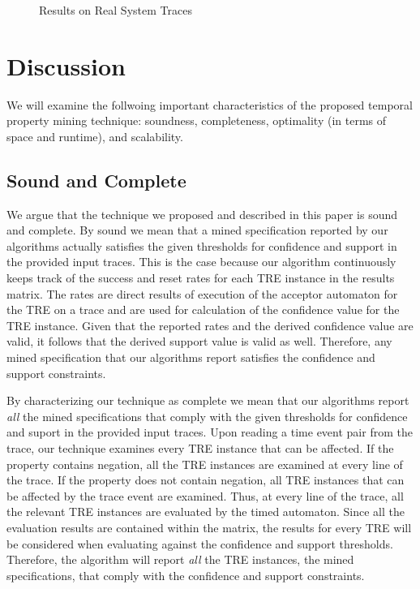 \documentclass[]{sigplanconf}
\begin{document}
\begin{figure}[!ht]
  \centering
  \caption{Results on Real System Traces}\label{Algs_real}
\end{figure}

\section{Discussion} \label{discussion}

We will examine the follwoing important characteristics of the proposed temporal property mining technique: soundness, completeness, optimality (in terms of space and runtime), and scalability.


\subsection{Sound and Complete}

We argue that the technique we proposed and described in this paper is sound and complete. By sound we mean that a mined specification reported by our algorithms actually satisfies the given thresholds for confidence and support in the provided input traces. This is the case because our algorithm continuously keeps track of the success and reset rates for each TRE instance in the results matrix. The rates are direct results of execution of the acceptor automaton for the TRE on a trace and are used for calculation of the confidence value for the TRE instance. Given that the reported rates and the derived confidence value are valid, it follows that the derived support value is valid as well. Therefore, any mined specification that our algorithms report satisfies the confidence and support constraints.

By characterizing our technique as complete we mean that our algorithms report \emph{all} the mined specifications that comply with the given thresholds for confidence and suport in the provided input traces. Upon reading a time event pair from the trace, our technique examines every TRE instance that can be affected. If the property contains negation, all the TRE instances are examined at every line of the trace. If the property does not contain negation, all TRE instances that can be affected by the trace event are examined. Thus, at every line of the trace, all the relevant TRE instances are evaluated by the timed automaton. Since all the evaluation results are contained within the matrix, the results for every TRE will be considered when evaluating against the confidence and support thresholds. Therefore, the algorithm will report \emph{all} the TRE instances, the mined specifications, that comply with the confidence and support constraints.
\end{document}
